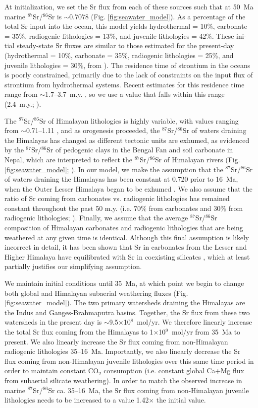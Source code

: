 \documentclass[11pt,letterpaper]{article}
\newcommand{\SrSr}{$^{87}$Sr/$^{86}$Sr\xspace}
\newcommand{\COtwo}{CO$_{2}$\xspace}
\begin{document}
At initialization, we set the Sr flux from each of these sources such that at 50~Ma marine \SrSr is $\sim$0.7078 (Fig. \ref{fig:seawater_model}). As a percentage of the total Sr input into the ocean, this model yields hydrothermal = 10\%, carbonate = 35\%, radiogenic lithologies = 13\%, and juvenile lithologies = 42\%. These ini- tial steady-state Sr fluxes are similar to those estimated for the present-day (hydrothermal = 10\%, carbonate = 35\%, radiogenic lithologies = 25\%, and juvenile lithologies = 30\%, from \citealt{Allegre2010a}). The residence time of strontium in the oceans is poorly constrained, primarily due to the lack of constraints on the input flux of strontium from hydrothermal systems. Recent estimates for this residence time range from $\sim$1.7--3.7~m.y. \citep{Krabbenhoft2010a}, so we use a value that falls within this range (2.4~m.y.; \citealp{Ravizza2003a}).

The \SrSr of Himalayan lithologies is highly variable, with values ranging from $\sim$0.71--1.11 \citep{Oliver2003a}, and as orogenesis proceeded, the \SrSr of waters draining the Himalayas has changed as different tectonic units are exhumed, as evidenced by the \SrSr of pedogenic clays in the Bengal Fan and soil carbonate in Nepal, which are interpreted to reflect the \SrSr of Himalayan rivers (Fig. \ref{fig:seawater_model}; \citealp{Derry1996a, Quade1997a}). In our model, we make the assumption that the \SrSr of waters draining the Himalayas has been constant at 0.720 prior to 16~Ma, when the Outer Lesser Himalaya began to be exhumed \citep{Myrow2015a, Colleps2018a}. We also assume that the ratio of Sr coming from carbonates vs. radiogenic lithologies has remained constant throughout the past 50 m.y. (i.e. 70\% from carbonates and 30\% from radiogenic lithologies; \citealp{Oliver2003a}). Finally, we assume that the average \SrSr composition of Himalayan carbonates and radiogenic lithologies that are being weathered at any given time is identical. Although this final assumption is likely incorrect in detail, it has been shown that Sr in carbonates from the Lesser and Higher Himalaya have equilibrated with Sr in coexisting silicates \citep{Oliver2003a}, which at least partially justifies our simplifying assumption.

We maintain initial conditions until 35~Ma, at which point we begin to change both global and Himalayan subaerial weathering fluxes (Fig. \ref{fig:seawater_model}). The two primary watersheds draining the Himalayas are the Indus and Ganges-Brahmaputra basins. Together, the Sr flux from these two watersheds in the present day is $\sim$9.5$\times$10$^{8}$~mol/yr. We therefore linearly increase the total Sr flux coming from the Himalayas to 1$\times$10$^{9}$~mol/yr from 35~Ma to present. We also linearly increase the Sr flux coming from non-Himalayan radiogenic lithologies 35--16~Ma. Importantly, we also linearly decrease the Sr flux coming from non-Himalayan juvenile lithologies over this same time period in order to maintain constant \COtwo consumption (i.e. constant global Ca+Mg flux from subaerial silicate weathering). In order to match the observed increase in marine \SrSr ca. 35--16~Ma, the Sr flux coming from non-Himalayan juvenile lithologies needs to be increased to a value 1.42$\times$ the initial value.
\end{document}
